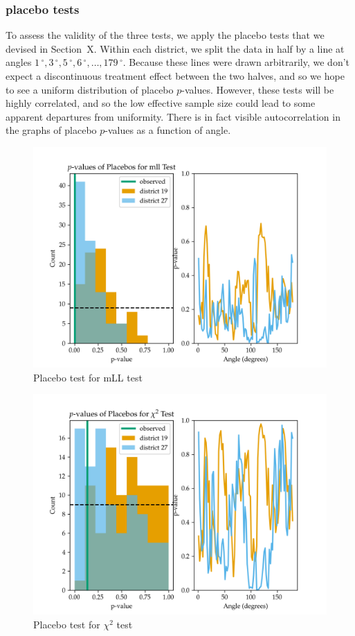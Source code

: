 \documentclass[letter]{article}
\makeatletter
\def\maxwidth{\ifdim\Gin@nat@width>\linewidth\linewidth
\else\Gin@nat@width\fi}
\let\Oldincludegraphics\includegraphics
\renewcommand{\includegraphics}[1]{\Oldincludegraphics[width=.8\maxwidth]{#1}}
\newcommand{\degree}{{\,^\circ}}
\makeatother
\begin{document}
    	\subsubsection{placebo tests}\label{placebo-tests}

To assess the validity of the three tests, we apply the placebo tests that we devised in Section~X.
Within each district, we split the data in half by a line at angles \(1\degree,3\degree,5\degree,6\degree,\ldots,179\degree\).
Because these lines were drawn arbitrarily, we don't expect a discontinuous treatment effect between the two halves, and so we hope to see a uniform distribution of placebo \(p\)-values.
However, these tests will be highly correlated,
and so the low effective sample size could lead to some apparent departures from uniformity.
There is in fact visible autocorrelation in the graphs of placebo \(p\)-values as a function of angle.

\begin{figure}
\centering
\includegraphics{NYC/NYC_plots/placebo_mLL.png}
\caption{Placebo test for mLL test}
\end{figure}

\begin{figure}
\centering
\includegraphics{NYC/NYC_plots/placebo_chi.png}
\caption{Placebo test for \(\chi^2\) test}
\end{figure}
\end{document}
